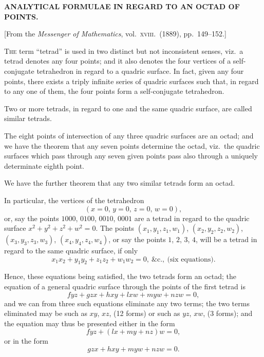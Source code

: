 \documentclass[11pt,a4paper]{article}
\theoremstyle{plain}
\theoremstyle{definition}
\begin{document}
\begin{center}
\textbf{ANALYTICAL FORMULAE IN REGARD TO AN OCTAD OF POINTS.}
\end{center}

\begin{center}
[From the \textit{Messenger of Mathematics}, vol.\ \textsc{xviii}.\ (1889), pp.\ 149--152.]
\end{center}

\textsc{The} term ``tetrad'' is used in two distinct but not inconsistent senses, viz.\ a tetrad denotes any four points; and it also denotes the four vertices of a self-conjugate tetrahedron in regard to a quadric surface. In fact, given any four points, there exists a triply infinite series of quadric surfaces such that, in regard to any one of them, the four points form a self-conjugate tetrahedron.

Two or more tetrads, in regard to one and the same quadric surface, are called similar tetrads.

The eight points of intersection of any three quadric surfaces are an octad; and we have the theorem that any seven points determine the octad, viz.\ the quadric surfaces which pass through any seven given points pass also through a uniquely determinate eighth point.

We have the further theorem that any two similar tetrads form an octad.

In particular, the vertices of the tetrahedron
\[ (x=0,\, y=0,\, z=0,\, w=0), \]
or, say the points $1000$, $0100$, $0010$, $0001$ are a tetrad in regard to the quadric surface $x^2 + y^2 + z^2 + w^2 = 0$. The points $(x_1, y_1, z_1, w_1)$, $(x_2, y_2, z_2, w_2)$, $(x_3, y_3, z_3, w_3)$, $(x_4, y_4, z_4, w_4)$, or say the points $1$, $2$, $3$, $4$, will be a tetrad in regard to the same quadric surface, if only
\[ x_1x_2 + y_1y_2 + z_1z_2 + w_1w_2 = 0,\ \&\text{c.},\ \text{(six equations)}. \]

Hence, these equations being satisfied, the two tetrads form an octad; the equation of a general quadric surface through the points of the first tetrad is
\[ fyz + gzx + hxy + lxw + myw + nzw = 0, \]
and we can from three such equations eliminate any two terms; the two terms eliminated may be such as $xy$, $xz$, (12 forms) or such as $yz$, $xw$, (3 forms); and the equation may thus be presented either in the form
\[ fyz + (lx + my + nz)w = 0, \]
or in the form
\[ gzx + hxy + myw + nzw = 0. \]
\end{document}
